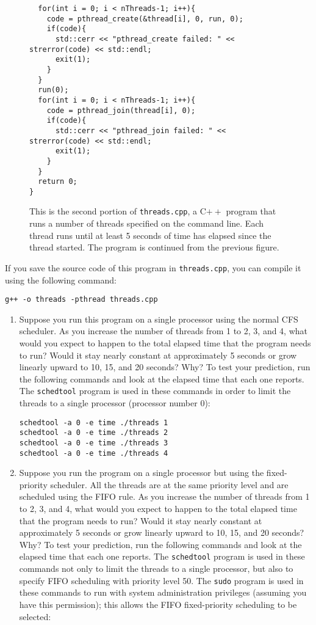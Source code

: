 \begin{chapterEnumerate}
\begin{figure}
\begin{verbatim}
  for(int i = 0; i < nThreads-1; i++){
    code = pthread_create(&thread[i], 0, run, 0);
    if(code){
      std::cerr << "pthread_create failed: " << strerror(code) << std::endl;
      exit(1);
    }
  }
  run(0);
  for(int i = 0; i < nThreads-1; i++){
    code = pthread_join(thread[i], 0);
    if(code){
      std::cerr << "pthread_join failed: " << strerror(code) << std::endl;
      exit(1);
    }
  }
  return 0;
}
\end{verbatim}
\caption{This is the second portion of \texttt{threads.cpp}, a C$++$ program that runs a number of threads specified on the command line.  Each thread runs until at least 5 seconds of time has elapsed since the thread started.  The program is continued from the previous figure.}\label{threads.cpp-part2}
\end{figure}
If you save the source code of this program in \texttt{threads.cpp}, you can compile it using the following command:
\begin{verbatim}
g++ -o threads -pthread threads.cpp
\end{verbatim}
\begin{enumerate}
\item
Suppose you run this program on a single processor using the normal CFS scheduler.  As you increase the number of threads from 1 to 2, 3, and 4, what would you expect to happen to the total elapsed time that the program needs to run?  Would it stay nearly constant at approximately 5 seconds or grow linearly upward to 10, 15, and 20 seconds?  Why?  To test your prediction, run the following commands and look at the elapsed time that each one reports.  The \texttt{schedtool} program is used in these commands in order to limit the threads to a single processor (processor number 0):
\begin{verbatim}
schedtool -a 0 -e time ./threads 1
schedtool -a 0 -e time ./threads 2
schedtool -a 0 -e time ./threads 3
schedtool -a 0 -e time ./threads 4
\end{verbatim}
\item
Suppose you run the program on a single processor but using the fixed-priority scheduler.  All
the threads are at the same priority level and are scheduled using the FIFO rule.
As you increase the number of threads from 1 to 2, 3, and 4, what would you expect to happen to the total elapsed time that the program needs to run?  Would it stay nearly constant at approximately 5 seconds or grow linearly upward to 10, 15, and 20 seconds?  Why?  To test your prediction, run the following commands and look at the elapsed time that each one reports.  The \texttt{schedtool} program is used in these commands not only to limit the threads to a single processor, but also to specify FIFO scheduling with priority level 50.  The \texttt{sudo} program is used in these commands to run with system administration privileges (assuming you have this permission); this allows the FIFO fixed-priority scheduling to be selected:

\end{enumerate}
\end{chapterEnumerate}
